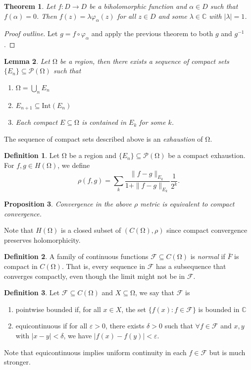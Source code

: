 \documentclass[letterpaper,12pt]{article}
\theoremstyle{definition}
\newtheorem{definition}{Definition}[section]
\theoremstyle{plain}
\newtheorem{thm}{Theorem}[section]
\newtheorem{proposition}[thm]{Proposition}
\newtheorem{lemma}[thm]{Lemma}
\theoremstyle{remark}
\newcommand{\C}{\mathbb{C}}
\let\oldOmega\Omega
\renewcommand{\Omega}{\mathrm{\oldOmega}}
\begin{document}
\begin{thm}
Let $f:D\to D$ be a biholomorphic function and $\alpha\in D$ such that $f(\alpha) = 0$. Then $f(z) = \lambda\varphi_\alpha(z)$ for all $z\in D$ and some $\lambda\in\C$ with $|\lambda| = 1$.
\end{thm}

\begin{proof}[Proof outline]
Let $g = f\circ\varphi_\alpha$ and apply the previous theorem to both $g$ and $g^{-1}$.
\end{proof}

\begin{lemma}
Let $\Omega$ be a region, then there exists a sequence of compact sets $\{E_n\}\subseteq \mathcal{P}(\Omega)$ such that
\begin{enumerate}
  \item $\Omega = \bigcup_n E_n$
  \item $E_{n+1}\subseteq \mathrm{Int}(E_n)$
  \item Each compact $E \subseteq \Omega$ is contained in $E_k$ for some $k$.
\end{enumerate}
\end{lemma}

The sequence of compact sets described above is an \emph{exhaustion} of $\Omega$.

\begin{definition}
Let $\Omega$ be a region and $\{E_n\}\subseteq \mathcal{P}(\Omega)$ be a compact exhaustion. For $f,g\in H(\Omega)$, we define
\[\rho(f,g) = \sum_k \frac{\|f-g\|_{E_k}}{1+\|f-g\|_{E_k}}\frac{1}{2^k}.\]
\end{definition}

\begin{proposition}
Convergence in the above $\rho$ metric is equivalent to compact convergence.
\end{proposition}

Note that $H(\Omega)$ is a closed subset of $(C(\Omega),\rho)$ since compact convergence preserves holomorphicity.

\begin{definition}
A family of continuous functions $\mathcal{F}\subseteq C(\Omega)$ is \emph{normal} if $\bar{F}$ is compact in $C(\Omega)$. That is, every sequence in $\mathcal{F}$ has a subsequence that converges compactly, even though the limit might not be in $\mathcal{F}$.
\end{definition}

\begin{definition}
Let $\mathcal{F}\subseteq C(\Omega)$ and $X\subseteq \Omega$, we say that $\mathcal{F}$ is
\begin{enumerate}
  \item pointwise bounded if, for all $x\in X$, the set $\{f(x):f\in \mathcal{F}\}$ is bounded in $\C$
  \item equicontinuous if for all $\varepsilon>0$, there exists $\delta>0$ such that $\forall f\in \mathcal{F}$ and $x,y$ with $|x-y|<\delta$, we have $|f(x)-f(y)|<\varepsilon$. 
\end{enumerate}
Note that equicontinuous implies uniform continuity in each $f\in \mathcal{F}$ but is much stronger.
\end{definition}
\end{document}
